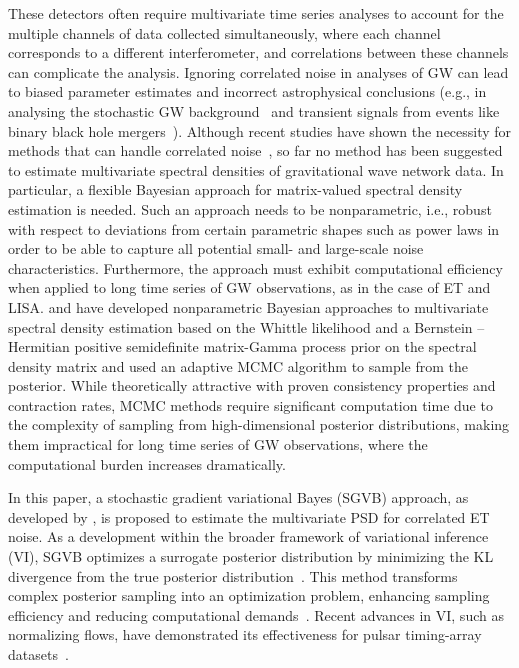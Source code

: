 \documentclass[%
 reprint,
 amsmath,amssymb,
 aps,
 nofootinbib,
]{revtex4-2}
\begin{document}
These detectors often require multivariate time series analyses to account for the multiple channels of data collected simultaneously, where each channel corresponds to a different interferometer, and correlations between these channels can complicate the analysis.
Ignoring correlated noise in analyses of \ac{GW} can lead to biased parameter estimates and incorrect astrophysical conclusions (e.g., in analysing the stochastic \ac{GW} background~\cite{Thrane_correlations_SGWB, Christensen_2019_SGWB, boileau2022figures} and transient signals from events like binary black hole mergers~\cite{Cireddu:2023:arXiv}). 
Although recent studies have shown the necessity for methods that can handle correlated noise~\cite{Cireddu:2023:arXiv,JanssensKamiel2023Ffps}, so far no method has been suggested to estimate  multivariate spectral densities  of gravitational wave network data. In particular, a flexible Bayesian approach for matrix-valued spectral density estimation is needed. 
Such an approach needs to be nonparametric, i.e., robust with respect to deviations from certain parametric shapes such as power laws in order to be able to capture all potential small- and large-scale noise characteristics.
Furthermore, the approach must exhibit computational efficiency when applied to long time series of \ac{GW} observations, as in the case of ET and LISA. 
\citet{MeierAlexander2020Bnao} and \citet{Liu2023} have developed  nonparametric Bayesian approaches to multivariate spectral density estimation based on the Whittle likelihood and a Bernstein -- Hermitian positive semidefinite matrix-Gamma process prior on the spectral density matrix and used an adaptive MCMC algorithm to sample from the posterior. 
While theoretically attractive with proven consistency properties and contraction rates, MCMC methods require significant computation time due to the complexity of sampling from high-dimensional posterior distributions, making them impractical for long time series of \ac{GW} observations, where the computational burden increases dramatically.


In this paper, a stochastic gradient variational Bayes (SGVB) approach, as developed by \citet{Hu2023}, is proposed to estimate the multivariate \ac{PSD} for correlated \ac{ET} noise. As a development within the broader framework of variational inference (VI), SGVB optimizes a surrogate posterior distribution by minimizing the \ac{KL} divergence from the true posterior distribution~\cite{Jordan1999,Wainwright2008,Blei2017}.  
This method transforms complex posterior sampling into an optimization problem, enhancing sampling efficiency and reducing computational demands~\cite{Blei2006,kingma2022}.
Recent advances in VI, such as normalizing flows, have demonstrated its effectiveness for pulsar timing-array datasets~\cite{Vallisneri2024}. 
\end{document}
